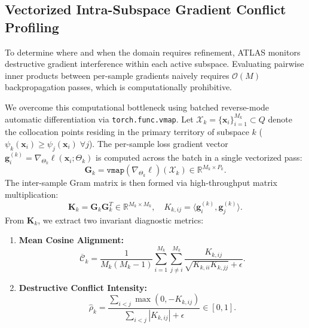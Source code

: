 \documentclass[runningheads]{llncs}
\begin{document}
\subsection{Vectorized Intra-Subspace Gradient Conflict Profiling}
To determine where and when the domain requires refinement, ATLAS monitors destructive gradient interference within each active subspace. Evaluating pairwise inner products between per-sample gradients naively requires $\mathcal{O}(M)$ backpropagation passes, which is computationally prohibitive.

We overcome this computational bottleneck using batched reverse-mode automatic differentiation via \texttt{torch.\allowbreak func.\allowbreak vmap}. Let $\mathcal{X}_k = \{\mathbf{x}_i\}_{i=1}^{M_k} \subset Q$ denote the collocation points residing in the primary territory of subspace $k$ ($\psi_k(\mathbf{x}_i) \ge \psi_j(\mathbf{x}_i) \; \forall j$). The per-sample loss gradient vector $\mathbf{g}_i^{(k)} = \nabla_{\Theta_k} \ell(\mathbf{x}_i; \Theta_k)$ is computed across the batch in a single vectorized pass:
\begin{equation}
\mathbf{G}_k = \texttt{vmap}\left(\nabla_{\Theta_k} \ell\right)(\mathcal{X}_k) \in \mathbb{R}^{M_k \times P_k}.
\end{equation}
The inter-sample Gram matrix is then formed via high-throughput matrix multiplication:
\begin{equation}
\mathbf{K}_k = \mathbf{G}_k \mathbf{G}_k^T \in \mathbb{R}^{M_k \times M_k}, \quad K_{k,ij} = \langle \mathbf{g}_i^{(k)}, \mathbf{g}_j^{(k)} \rangle.
\end{equation}
From $\mathbf{K}_k$, we extract two invariant diagnostic metrics:
\begin{enumerate}
    \item \textbf{Mean Cosine Alignment:}
    \begin{equation}
    \overline{\mathcal{C}}_k = \frac{1}{M_k(M_k - 1)} \sum_{i=1}^{M_k} \sum_{j \neq i}^{M_k} \frac{K_{k,ij}}{\sqrt{K_{k,ii} K_{k,jj}} + \epsilon}.
    \end{equation}
    \item \textbf{Destructive Conflict Intensity:}
    \begin{equation}
    \hat{\rho}_k = \frac{\sum_{i < j} \max(0, -K_{k,ij})}{\sum_{i < j} |K_{k,ij}| + \epsilon} \in [0, 1].
    \end{equation}
\end{enumerate}
\end{document}
